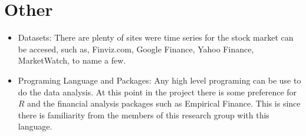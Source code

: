 \documentclass{article}
\begin{document}
\section*{Other}

\begin{itemize}

\item Datasets: There are plenty of sites were time series for the stock market can be accesed, such as, Finviz.com, Google Finance, Yahoo Finance, MarketWatch, to name a few. 

\item Programing Language and Packages: Any high level programing can be use to do the data analysis. At this point in the project there is some preference for $R$ 
and the financial analysis packages such as Empirical Finance. This is since there
is familiarity from the members of this research group with this language. 

\end{itemize}
\end{document}
